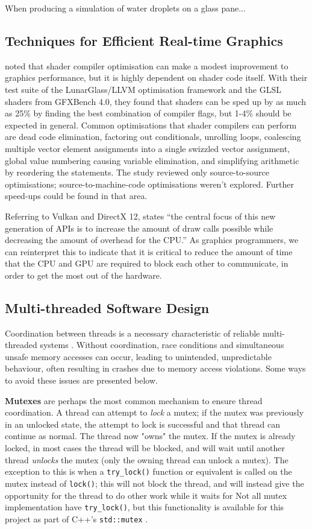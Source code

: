 \documentclass[11pt, a4paper, twocolumn]{article}
\begin{document}
When producing a simulation of water droplets on a glass pane... \citet{Chen2012}

\subsection{Techniques for Efficient Real-time Graphics}

\citet{Crawford2018} noted that shader compiler optimisation can make a modest improvement to graphics performance, but it is highly dependent on shader code itself. With their test suite of the LunarGlass/LLVM optimisation framework and the GLSL shaders from GFXBench 4.0, they found that shaders can be sped up by as much as 25\% by finding the best combination of compiler flags, but 1-4\% should be expected in general. Common optimisations that shader compilers can perform are dead code elimination, factoring out conditionals, unrolling loops, coalescing multiple vector element assignments into a single swizzled vector assignment, global value numbering causing variable elimination, and simplifying arithmetic by reordering the statements. The study reviewed only source-to-source optimisations; source-to-machine-code optimisations weren't explored. Further speed-ups could be found in that area.

Referring to Vulkan and DirectX 12, \citet{Joseph2016} states ``the central focus of this new generation of APIs is to increase the amount of draw calls possible while decreasing the amount of overhead for the CPU.'' As graphics programmers, we can reinterpret this to indicate that it is critical to reduce the amount of time that the CPU and GPU are required to block each other to communicate, in order to get the most out of the hardware.

\subsection{Multi-threaded Software Design}

Coordination between threads is a necessary characteristic of reliable multi-threaded systems \citep{Powell}. Without coordination, race conditions and simultaneous unsafe memory accesses can occur, leading to unintended, unpredictable behaviour, often resulting in crashes due to memory access violations. Some ways to avoid these issues are presented below.

\textbf{Mutexes} are perhaps the most common mechanism to ensure thread coordination. A thread can attempt to \emph{lock} a mutex; if the mutex was previously in an unlocked state, the attempt to lock is successful and that thread can continue as normal. The thread now "owns" the mutex. If the mutex is already locked, in most cases the thread will be blocked, and will wait until another thread \emph{unlocks} the mutex (only the owning thread can unlock a mutex). The exception to this is when a \verb|try_lock()| function or equivalent is called on the mutex instead of \verb|lock()|; this will not block the thread, and will instead give the opportunity for the thread to do other work while it waits for  Not all mutex implementation have \verb|try_lock()|, but this functionality is available for this project as part of C++'s \verb|std::mutex| \citep{CppMutex}.
\end{document}
